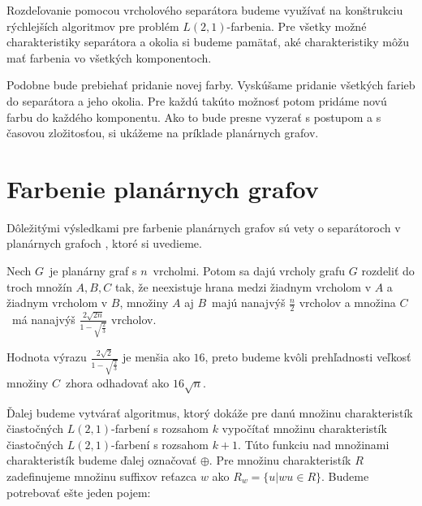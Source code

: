 Rozdeľovanie pomocou vrcholového separátora budeme využívať na konštrukciu rýchlejších algoritmov
pre problém $L(2,1)$-farbenia. Pre všetky možné charakteristiky separátora a okolia si budeme pamätať,
aké charakteristiky môžu mať farbenia vo všetkých komponentoch.

Podobne bude prebiehať pridanie novej
farby. Vyskúšame pridanie všetkých farieb do separátora a jeho okolia. Pre každú takúto možnosť potom
pridáme novú farbu do každého komponentu. Ako to bude presne vyzerať s postupom a s časovou zložitosťou,
si ukážeme na príklade planárnych grafov.

\section{Farbenie planárnych grafov}

Dôležitými výsledkami pre farbenie planárnych grafov sú vety o separátoroch v planárnych grafoch \cite{tarjan_plansep},
ktoré si uvedieme.

\begin{veta}
    \label{planarsep-veta}
    Nech $G$ je planárny graf s $n$ vrcholmi. Potom sa dajú vrcholy grafu $G$ rozdeliť do troch množín $A, B, C$ tak,
    že neexistuje hrana medzi žiadnym vrcholom v $A$ a žiadnym vrcholom v $B$, množiny $A$ aj $B$ majú nanajvýš $\frac{n}{2}$
    vrcholov a množina $C$ má nanajvýš $\frac{2 \sqrt{2n}}{1 - \sqrt{\frac{2}{3}}}$ vrcholov.
\end{veta}

\begin{pozn}
Hodnota výrazu $\frac{2 \sqrt{2}}{1 - \sqrt{\frac{2}{3}}}$ je menšia ako $16$, preto budeme kvôli prehľadnosti
veľkosť množiny $C$ zhora odhadovať ako $16 \sqrt{n}$.
\end{pozn}

Ďalej budeme vytvárať algoritmus, ktorý dokáže pre danú množinu charakteristík čiastočných $L(2,1)$-farbení
s rozsahom $k$ vypočítať množinu charakteristík čiastočných $L(2,1)$-farbení s rozsahom $k+1$. Túto funkciu
nad množinami charakteristík budeme ďalej označovať $\oplus$. Pre množinu charakteristík $R$ zadefinujeme
množinu suffixov reťazca $w$ ako $R_w = \{u | wu \in R \}$. Budeme potrebovať ešte jeden pojem:

